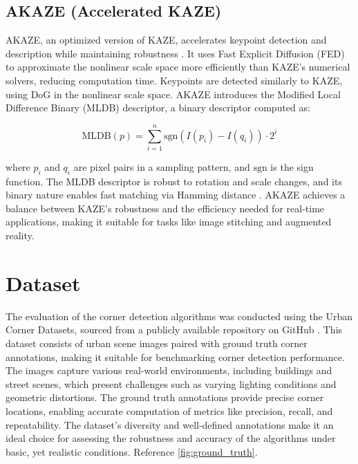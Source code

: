 \documentclass[journal]{IEEEtran}
\begin{document}
\subsection{AKAZE (Accelerated KAZE)}
AKAZE, an optimized version of KAZE, accelerates keypoint detection and description while maintaining robustness \cite{KAZE}. It uses Fast Explicit Diffusion (FED) to approximate the nonlinear scale space more efficiently than KAZE’s numerical solvers, reducing computation time. Keypoints are detected similarly to KAZE, using DoG in the nonlinear scale space. AKAZE introduces the Modified Local Difference Binary (MLDB) descriptor, a binary descriptor computed as:

\begin{equation}
\text{MLDB}(p) = \sum_{i=1}^{n} \text{sgn}(I(p_i) - I(q_i)) \cdot 2^i
\end{equation}

where \( p_i \) and \( q_i \) are pixel pairs in a sampling pattern, and \( \text{sgn} \) is the sign function. The MLDB descriptor is robust to rotation and scale changes, and its binary nature enables fast matching via Hamming distance \cite{KAZE}. AKAZE achieves a balance between KAZE’s robustness and the efficiency needed for real-time applications, making it suitable for tasks like image stitching and augmented reality.\\

\section{Dataset}
\label{section:datset}

The evaluation of the corner detection algorithms was conducted using the Urban Corner Datasets, sourced from a publicly available repository on GitHub \cite{Urban_Corner_Dataset}. This dataset consists of urban scene images paired with ground truth corner annotations, making it suitable for benchmarking corner detection performance. The images capture various real-world environments, including buildings and street scenes, which present challenges such as varying lighting conditions and geometric distortions. The ground truth annotations provide precise corner locations, enabling accurate computation of metrics like precision, recall, and repeatability. The dataset’s diversity and well-defined annotations make it an ideal choice for assessing the robustness and accuracy of the algorithms under basic, yet realistic conditions. Reference \cref{fig:ground_truth}.\\
\end{document}
